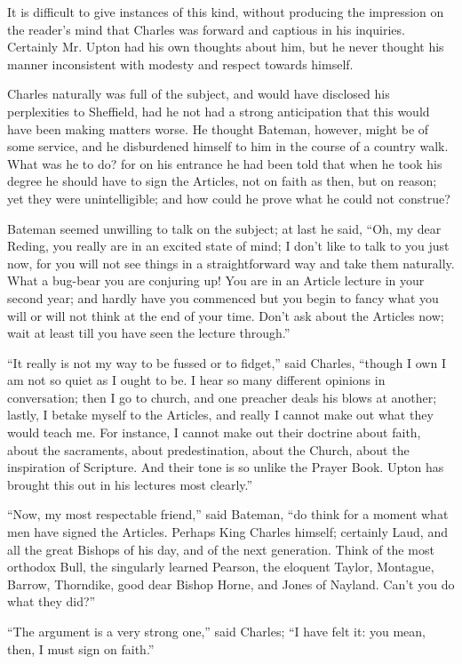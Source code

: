 It is difficult to give instances of this kind, without producing
the impression on the reader's mind that Charles was forward and
captious in his inquiries. Certainly Mr. Upton had his own thoughts
about him, but he never thought his manner inconsistent with modesty
and respect towards himself.

Charles naturally was full of the subject, and would have disclosed
his perplexities to Sheffield, had he not had a strong anticipation
that this would have been making matters worse. He thought Bateman,
however, might be of some service, and he disburdened himself to him
in the course of a country walk. What was he to do? for on his
entrance he had been told that when he took his degree he should
have to sign the Articles, not on faith as then, but on reason; yet
they were unintelligible; and how could he prove what he could not
construe?

Bateman seemed unwilling to talk on the subject; at last he said,
``Oh, my dear Reding, you really are in an excited state of mind;
I don't like to talk to you just now, for you will not see things in a
straightforward way and take them naturally. What a bug-bear you are
conjuring up! You are in an Article lecture in your second year; and
hardly have you commenced but you begin to fancy what you will or will
not think at the end of your time. Don't ask about the Articles now;
wait at least till you have seen the lecture through.''

``It really is not my way to be fussed or to fidget,'' said
Charles, ``though I own I am not so quiet as I ought to be. I hear
so many different opinions in conversation; then I go to church, and
one preacher deals his blows at another; lastly, I betake myself to
the Articles, and really I cannot make out what they would teach me.
For instance, I cannot make out their doctrine about faith, about the
sacraments, about predestination, about the Church, about the
inspiration of Scripture. And their tone is so unlike the Prayer Book.
Upton has brought this out in his lectures most clearly.''

``Now, my most respectable friend,'' said Bateman, ``do
think for a moment what men have signed the Articles. Perhaps King
Charles himself; certainly Laud, and all the great Bishops of his day,
and of the next generation. Think of the most orthodox Bull, the
singularly learned Pearson, the eloquent Taylor, Montague, Barrow,
Thorndike, good dear Bishop Horne, and Jones of Nayland. Can't you do
what they did?''

``The argument is a very strong one,'' said Charles;
``I have felt it: you mean, then, I must sign on faith.''

